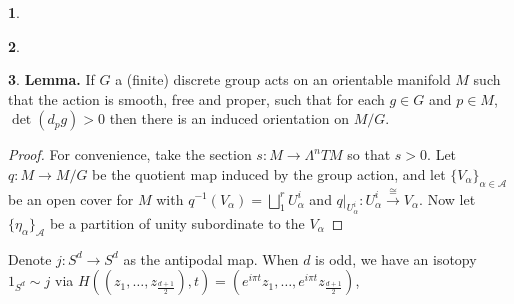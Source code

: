 \documentclass[10.5pt]{article}
\theoremstyle{definition}
\newtheorem{pb}{}
\newcommand{\set}[1]{\{#1\}}
\begin{document}
    \begin{pb}
        
    \end{pb}
    \begin{pb}
        
    \end{pb}
    \begin{pb}
        \textbf{Lemma.} If \(G\) a (finite) discrete group acts on an orientable manifold \(M\) such that the action is smooth, free and proper, such that for each \(g \in G\) and \(p \in M\), \(\det (d_p g) > 0\) then there is an induced orientation on \(M/G\).
        \begin{proof}
            For convenience, take the section \(s: M \to \Lambda^n TM\) so that \(s > 0\). Let \(q: M \to M/G\) be the quotient map induced by the group action, and let \(\set{V_\alpha}_{\alpha \in \mathcal{A}}\) be an open cover for \(M\) with \(q^{-1}(V_\alpha) = \bigsqcup_1^r U_\alpha^i\) and \(q\vert_{U_\alpha^i}: U_\alpha^i \overset{\cong}{\longrightarrow} V_\alpha\). Now let \(\set{\eta_\alpha}_\mathcal{A}\) be a partition of unity subordinate to the \(V_\alpha\)
        \end{proof}

        Denote \(j:S^d \to S^d\) as the antipodal map. When \(d\) is odd, we have an isotopy \(1_{S^d} \sim j\) via \(H((z_1,\hdots,z_{\frac{d+1}{2}}),t) = (e^{i\pi t}z_1,\hdots,e^{i\pi t}z_{\frac{d+1}{2}})\), 
    \end{pb}
\end{document}
